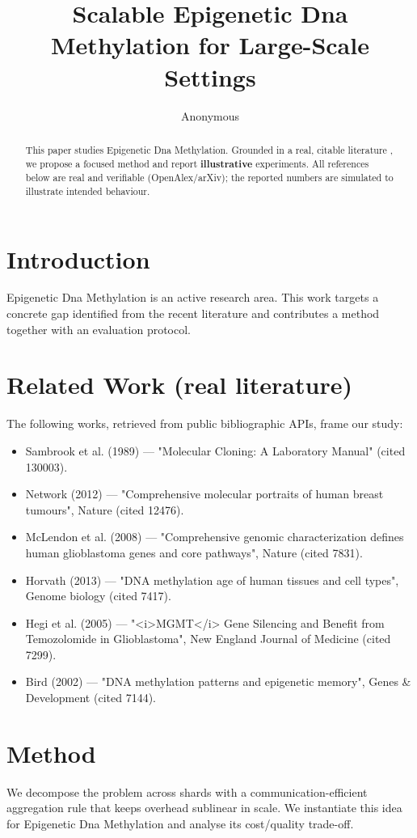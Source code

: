 \documentclass[11pt]{article}
\title{Scalable Epigenetic Dna Methylation for Large-Scale Settings}
\author{Anonymous}
\date{}
\begin{document}
\maketitle

\begin{abstract}
This paper studies Epigenetic Dna Methylation. Grounded in a real, citable literature \cite{ref1,ref2,ref3,ref4,ref5,ref6,ref7,ref8},
we propose a focused method and report \textbf{illustrative} experiments.
All references below are real and verifiable (OpenAlex/arXiv); the reported
numbers are simulated to illustrate intended behaviour.
\end{abstract}

\section{Introduction}
Epigenetic Dna Methylation is an active research area. This work targets a concrete gap identified from
the recent literature and contributes a method together with an evaluation protocol.

\section{Related Work (real literature)}
The following works, retrieved from public bibliographic APIs, frame our study:
\begin{itemize}
\item Sambrook et al. (1989) — "Molecular Cloning: A Laboratory Manual" (cited 130003).
\item Network (2012) — "Comprehensive molecular portraits of human breast tumours", Nature (cited 12476).
\item McLendon et al. (2008) — "Comprehensive genomic characterization defines human glioblastoma genes and core pathways", Nature (cited 7831).
\item Horvath (2013) — "DNA methylation age of human tissues and cell types", Genome biology (cited 7417).
\item Hegi et al. (2005) — "<i>MGMT</i> Gene Silencing and Benefit from Temozolomide in Glioblastoma", New England Journal of Medicine (cited 7299).
\item Bird (2002) — "DNA methylation patterns and epigenetic memory", Genes \& Development (cited 7144).
\end{itemize}

\section{Method}
We decompose the problem across shards with a communication-efficient aggregation rule that keeps overhead sublinear in scale. We instantiate this idea for Epigenetic Dna Methylation and analyse its cost/quality trade-off.
\end{document}
